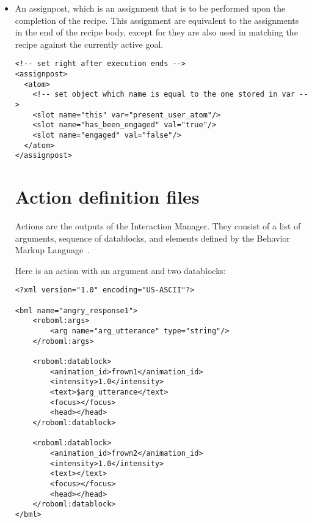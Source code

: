 \begin{itemize}
\item An assignpost, which is an assignment that is to be performed upon the completion of the recipe. This assignment are equivalent to the assignments in the end of the recipe body, except for they are also used in matching the recipe against the currently active goal. 

\begin{lstlisting}
<!-- set right after execution ends -->
<assignpost>
  <atom>
    <!-- set object which name is equal to the one stored in var -->
    <slot name="this" var="present_user_atom"/>
    <slot name="has_been_engaged" val="true"/>
    <slot name="engaged" val="false"/>
  </atom>
</assignpost>
\end{lstlisting}

\section{Action definition files}

Actions are the outputs of the Interaction Manager. They consist of a list of arguments, sequence of datablocks, and elements defined by the Behavior Markup Language~\citep{BMLweb}.


Here is an action with an argument and two datablocks:
\begin{lstlisting}
<?xml version="1.0" encoding="US-ASCII"?>

<bml name="angry_response1">
    <roboml:args>
        <arg name="arg_utterance" type="string"/>
    </roboml:args>

    <roboml:datablock>
        <animation_id>frown1</animation_id>
        <intensity>1.0</intensity>
        <text>$arg_utterance</text>
        <focus></focus>
        <head></head>
    </roboml:datablock>

    <roboml:datablock>
        <animation_id>frown2</animation_id>
        <intensity>1.0</intensity>
        <text></text>
        <focus></focus>
        <head></head>
    </roboml:datablock>
</bml>
\end{lstlisting}




\end{itemize}

